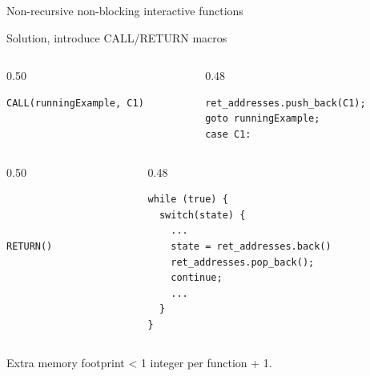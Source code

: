 \documentclass[aspectratio=169,11pt]{beamer}
\begin{document}
\begin{frame}{Non-recursive non-blocking interactive functions}
{
}
\end{frame}

\begin{frame}{Solution, introduce CALL/RETURN macros}
\begin{columns}[T,onlytextwidth]
\begin{column}{0.50\textwidth}
\begin{lstlisting}[style=cppstyle, numbers=none]
CALL(runningExample, C1)
\end{lstlisting}
\end{column}
\begin{column}{0.48\textwidth}
\begin{lstlisting}[style=cppstyle, numbers=none]
ret_addresses.push_back(C1);
goto runningExample;
case C1:
\end{lstlisting}
\end{column}
\end{columns}

\begin{columns}[T,onlytextwidth]
\begin{column}{0.50\textwidth}
\begin{lstlisting}[style=cppstyle, numbers=none]



RETURN()
\end{lstlisting}
\end{column}
\begin{column}{0.48\textwidth}
\begin{lstlisting}[style=cppstyle, numbers=none]
while (true) {
  switch(state) {
    ...
    state = ret_addresses.back()
    ret_addresses.pop_back();
    continue;
    ...
  }
}
\end{lstlisting}
\end{column}
\end{columns}
Extra memory footprint < 1 integer per function + 1.
\end{frame}
\end{document}
